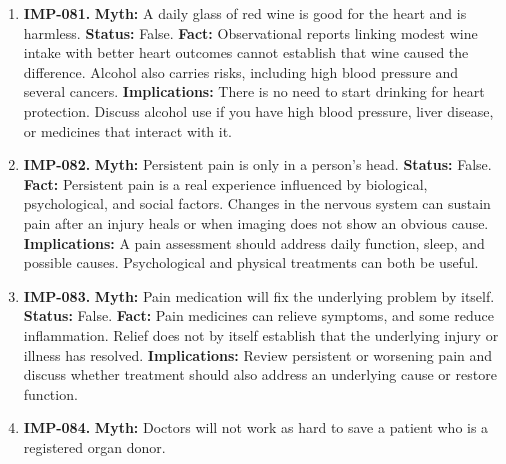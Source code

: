 \documentclass[11pt,oneside]{book}
\begin{document}
\begin{enumerate}[leftmargin=0pt,labelwidth=0pt,labelsep=0pt,itemindent=0pt]
\textbf{Status:} False.\newline
\textbf{Fact:} Hepatitis means inflammation of the liver. Viruses are important causes, but autoimmune disease, alcohol, and certain medicines can also cause it. \cite{ref425,ref424}\newline
\textbf{Implications:} Treatment and the possibility of transmission depend on the cause. The word hepatitis alone does not mean a person is infectious.
\item[] \textbf{IMP-081.} \textbf{Myth:} A daily glass of red wine is good for the heart and is harmless.\newline
\textbf{Status:} False.\newline
\textbf{Fact:} Observational reports linking modest wine intake with better heart outcomes cannot establish that wine caused the difference. Alcohol also carries risks, including high blood pressure and several cancers. \cite{ref426}\newline
\textbf{Implications:} There is no need to start drinking for heart protection. Discuss alcohol use if you have high blood pressure, liver disease, or medicines that interact with it.
\item[] \textbf{IMP-082.} \textbf{Myth:} Persistent pain is only in a person's head.\newline
\textbf{Status:} False.\newline
\textbf{Fact:} Persistent pain is a real experience influenced by biological, psychological, and social factors. Changes in the nervous system can sustain pain after an injury heals or when imaging does not show an obvious cause. \cite{ref234}\newline
\textbf{Implications:} A pain assessment should address daily function, sleep, and possible causes. Psychological and physical treatments can both be useful.
\item[] \textbf{IMP-083.} \textbf{Myth:} Pain medication will fix the underlying problem by itself.\newline
\textbf{Status:} False.\newline
\textbf{Fact:} Pain medicines can relieve symptoms, and some reduce inflammation. Relief does not by itself establish that the underlying injury or illness has resolved. \cite{ref234,ref250}\newline
\textbf{Implications:} Review persistent or worsening pain and discuss whether treatment should also address an underlying cause or restore function.
\item[] \textbf{IMP-084.} \textbf{Myth:} Doctors will not work as hard to save a patient who is a registered organ donor.\newline

\end{enumerate}
\end{document}
